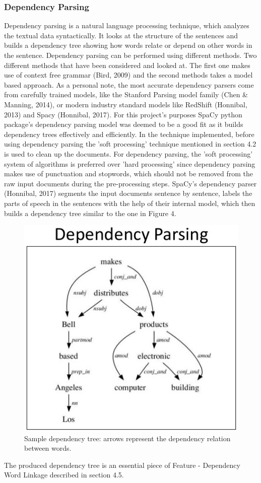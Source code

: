 \documentclass{sig-alternate}
\begin{document}
\subsubsection{Dependency Parsing}
Dependency parsing is a natural language processing technique, which analyzes the textual data syntactically. It looks at the structure of the sentences and builds a dependency tree showing how words relate or depend on other words in the sentence. Dependency parsing can be performed using different methods. Two different methods that have been considered and looked at. The first one makes use of context free grammar (Bird, 2009) and the second methods takes a model based approach. As a personal note, the most accurate dependency parsers come from carefully trained models, like the Stanford Parsing model family (Chen \& Manning, 2014), or modern industry standard models like RedShift (Honnibal, 2013) and Spacy (Honnibal, 2017). For this project's purposes SpaCy python package's dependency parsing model was deemed to be a good fit as it builds dependency trees effectively and efficiently. 
In the technique implemented, before using dependency parsing the 'soft processing' technique mentioned in section 4.2 is used to clean up the documents. For dependency parsing, the 'soft processing' system of algorithms is preferred over 'hard processing' since dependency parsing makes use of punctuation and stopwords, which should not be removed from the raw input documents during the pre-processing steps. SpaCy's dependency parser (Honnibal, 2017) segments the input documents sentence by sentence, labels the parts of speech in the sentences with the help of their internal model, which then builds a dependency tree similar to the one in Figure 4.


\begin{figure}
\centering
\includegraphics[scale=0.60]{images/dependency-parsing.jpg}
\caption{Sample dependency tree: arrows represent the dependency relation between words.}
\end{figure}
The produced dependency tree is an essential piece of Feature - Dependency Word Linkage described in section 4.5.
\end{document}
